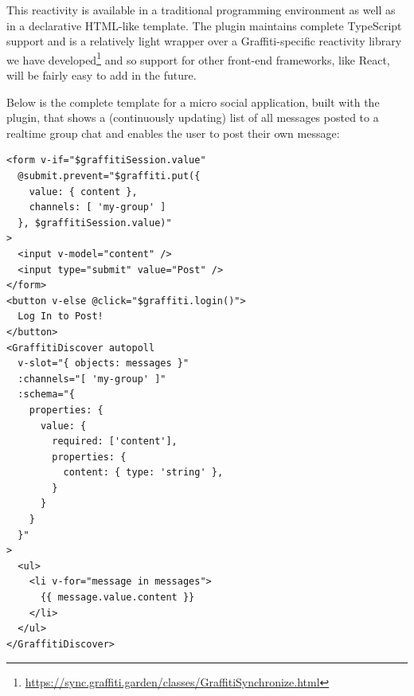 


This reactivity is available in a traditional programming
environment as well as in a declarative HTML-like template.
The plugin maintains complete TypeScript support and
is a relatively light wrapper over a Graffiti-specific reactivity library we have developed\footnote{
   \url{https://sync.graffiti.garden/classes/GraffitiSynchronize.html}
}
and so support for other front-end frameworks, like React, will be
fairly easy to add in the future.

Below is the complete template for a micro social application,
built with the plugin, that shows a (continuously updating) list of all messages posted to a realtime group chat and enables the user to post their own message:
\begin{verbatim}
<form v-if="$graffitiSession.value"
  @submit.prevent="$graffiti.put({
    value: { content },
    channels: [ 'my-group' ]
  }, $graffitiSession.value)"
>
  <input v-model="content" />
  <input type="submit" value="Post" />
</form>
<button v-else @click="$graffiti.login()">
  Log In to Post!
</button>
<GraffitiDiscover autopoll
  v-slot="{ objects: messages }"
  :channels="[ 'my-group' ]"
  :schema="{
    properties: {
      value: {
        required: ['content'],
        properties: {
          content: { type: 'string' },
        }
      }
    }
  }"
>
  <ul>
    <li v-for="message in messages">
      {{ message.value.content }}
    </li>
  </ul>
</GraffitiDiscover>
\end{verbatim}

